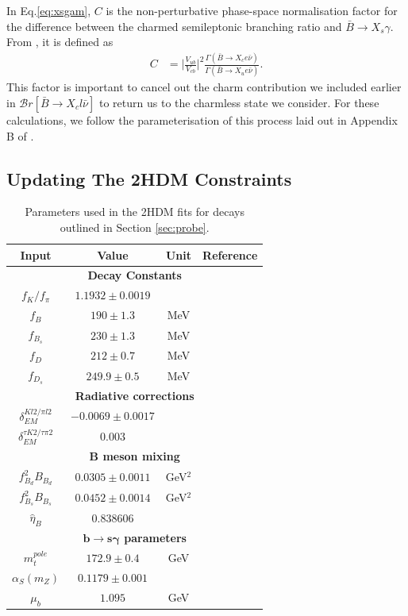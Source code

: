 \documentclass[a4paper,12pt]{article}
\begin{document}
In Eq.\eqref{eq:xsgam}, $C$ is the non-perturbative phase-space normalisation factor for the difference between the charmed semileptonic branching ratio and $\bar{B}\to X_s\gamma$. 
From \cite{nnlo}, it is defined as 
\begin{align}
    \label{eq:phasespace}
    C &= \bigg|\frac{V_{ub}}{V_{cb}}\bigg|^2\frac{\Gamma(\bar{B}\to X_ce\bar{\nu})}{\Gamma(\bar{B}\to X_ue\bar{\nu})}.
\end{align}
This factor is important to cancel out the charm contribution we included earlier in $\mathcal{B}r[\bar{B}\to X_cl\bar{\nu}]$ to return us to the charmless state we consider.
For these calculations, we follow the parameterisation of this process laid out in Appendix B of \cite{desc}.

\subsection{Updating The 2HDM Constraints}
\label{subsec:fit}
\begin{table}
    \centering
    \begin{tabular}{c|ccc}
        \hline\hline
        Input & Value & Unit & Reference \\
        \hline\hline
        \multicolumn{4}{c}{\bfseries Decay Constants} \\
        \hline\hline
        $f_K/f_\pi$ & $1.1932\pm0.0019$ & & \cite{pdg}\\
        $f_B$ & $190\pm1.3$ & MeV & \cite{flag} \\
        $f_{B_s}$ & $230\pm1.3$ & MeV & \cite{flag} \\
        $f_D$ & $212\pm0.7$ & MeV & \cite{flag} \\
        $f_{D_s}$ & $249.9\pm0.5$ & MeV & \cite{flag} \\
        \hline\hline
        \multicolumn{4}{c}{\bfseries Radiative corrections} \\
        \hline\hline
        $\delta^{Kl2/\pi l2}_{EM}$ & $-0.0069\pm0.0017$ & & \cite{pdg} \\
        $\delta^{\tau K2/\tau\pi 2}_{EM}$ & $0.003$ & & \cite{desc} \\
        \hline\hline
        \multicolumn{4}{c}{\bfseries B meson mixing} \\
        \hline\hline
        $f^2_{B_d}B_{B_d}$ & $0.0305\pm0.0011$ & GeV$^2$ & \cite{bmix} \\
        $f^2_{B_s}B_{B_s}$ & $0.0452\pm0.0014$ & GeV$^2$ & \cite{bmix} \\
        $\hat{\eta}_B$ & $0.838606$ & & \cite{alex} \\
        \hline\hline
        \multicolumn{4}{c}{\bfseries $\mathbf{b\to s\gamma}$ parameters} \\
        \hline\hline
        $m_t^{pole}$ & $172.9\pm0.4$ & GeV & \cite{pdg} \\
        $\alpha_S(m_Z)$ & $0.1179\pm0.001$ & & \cite{pdg} \\
        $\mu_b$ & $1.095$ & GeV & \\
        \hline\hline
    \end{tabular}
    \caption{\label{tab:params} Parameters used in the 2HDM fits for decays outlined in Section \ref{sec:probe}.}
\end{table}
\end{document}
